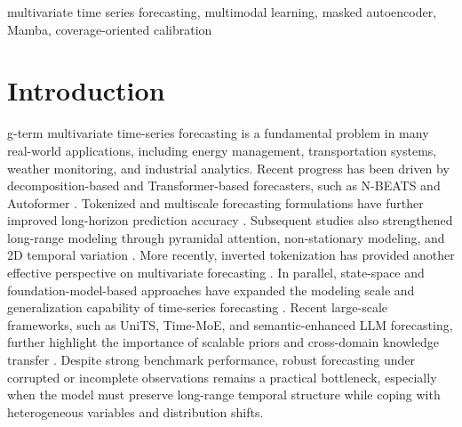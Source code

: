 \documentclass[journal]{IEEEtran}
\begin{document}
\begin{IEEEkeywords}
multivariate time series forecasting, multimodal learning, masked autoencoder, Mamba, coverage-oriented calibration
\end{IEEEkeywords}


\IEEEpeerreviewmaketitle



\section{Introduction}

g-term multivariate time-series forecasting is a fundamental problem in many real-world applications, including energy management, transportation systems, weather monitoring, and industrial analytics. Recent progress has been driven by decomposition-based and Transformer-based forecasters, such as N-BEATS and Autoformer \cite{oreshkin2020nbeats,wu2021autoformer}. Tokenized and multiscale forecasting formulations have further improved long-horizon prediction accuracy \cite{nie2023time,wang2024timemixer}. Subsequent studies also strengthened long-range modeling through pyramidal attention, non-stationary modeling, and 2D temporal variation \cite{liu2022pyraformer,liu2022nonstationary,wu2023timesnet}. More recently, inverted tokenization has provided another effective perspective on multivariate forecasting \cite{liu2024itransformer}. In parallel, state-space and foundation-model-based approaches have expanded the modeling scale and generalization capability of time-series forecasting \cite{gu2023mamba,liu2024timer,ansari2024chronos}. Recent large-scale frameworks, such as UniTS, Time-MoE, and semantic-enhanced LLM forecasting, further highlight the importance of scalable priors and cross-domain knowledge transfer \cite{gao2024units,shi2025timemoe,liu2026semantic}. Despite strong benchmark performance, robust forecasting under corrupted or incomplete observations remains a practical bottleneck, especially when the model must preserve long-range temporal structure while coping with heterogeneous variables and distribution shifts.
\end{document}
